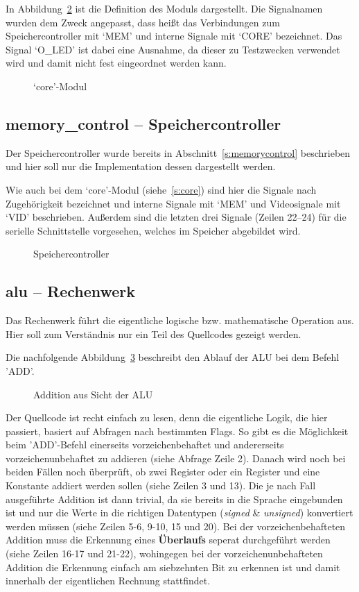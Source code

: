 In Abbildung~\ref{code:core} ist die Definition des Moduls dargestellt. Die
Signalnamen wurden dem Zweck angepasst, dass heißt das Verbindungen zum
Speichercontroller mit `MEM' und interne Signale mit `CORE' bezeichnet. Das
Signal `O\_LED' ist dabei eine Ausnahme, da dieser zu Testzwecken verwendet wird
und damit nicht fest eingeordnet werden kann.
\begin{figure}[htb]

\caption{`core'-Modul}
\label{code:core}
\end{figure}
\pagebreak
\subsection{memory\_control -- Speichercontroller}
\label{s:memcontrol}
Der Speichercontroller wurde bereits in Abschnitt~\ref{s:memorycontrol}
beschrieben und hier soll nur die Implementation dessen dargestellt werden.

Wie auch bei dem `core'-Modul (siehe~\ref{s:core}) sind hier die Signale nach
Zugehörigkeit bezeichnet und interne Signale mit `MEM' und Videosignale mit
`VID' beschrieben. Außerdem sind die letzten drei Signale (Zeilen 22--24) für
die serielle Schnittstelle vorgesehen, welches im Speicher abgebildet wird.
\begin{figure}[htb]

\caption{Speichercontroller}
\label{code:core}
\end{figure}
\pagebreak
\subsection{alu -- Rechenwerk}
Das Rechenwerk führt die eigentliche logische bzw. mathematische Operation aus.
Hier soll zum Verständnis nur ein Teil des Quellcodes gezeigt werden.

Die nachfolgende Abbildung~\ref{code:alu_add} beschreibt den Ablauf der \ac{ALU} bei dem Befehl
'ADD'.

\begin{figure}[htb]

\caption{Addition aus Sicht der ALU}
\label{code:alu_add}
\end{figure}
Der Quellcode ist recht einfach zu lesen, denn die eigentliche Logik, die hier
passiert, basiert auf Abfragen nach bestimmten Flags. So gibt es die Möglichkeit
beim 'ADD'-Befehl einerseits vorzeichenbehaftet und andererseits
vorzeichenunbehaftet zu addieren (siehe Abfrage Zeile 2). Danach wird noch bei
beiden Fällen noch überprüft, ob zwei Register oder ein Register und eine
Konstante addiert werden sollen (siehe Zeilen 3 und 13). Die je nach Fall
ausgeführte Addition ist dann trivial, da sie bereits in die Sprache eingebunden
ist und nur die Werte in die richtigen Datentypen (\textit{signed} \&
\textit{unsigned}) konvertiert werden müssen (siehe Zeilen 5-6, 9-10, 15 und
20).  Bei der vorzeichenbehafteten Addition muss die Erkennung eines
\textbf{Überlaufs} seperat durchgeführt werden (siehe Zeilen 16-17 und 21-22),
wohingegen bei der vorzeichenunbehafteten Addition die Erkennung einfach am
siebzehnten Bit zu erkennen ist und damit innerhalb der eigentlichen Rechnung
stattfindet.
